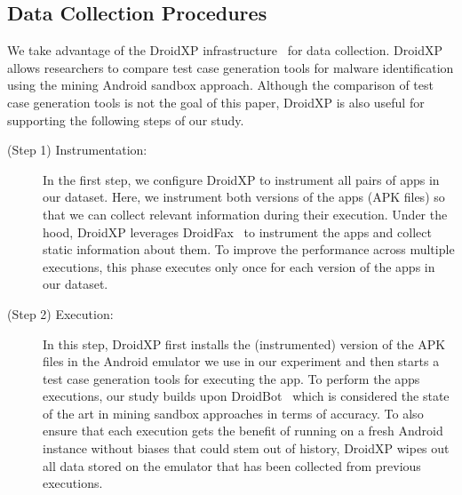 
\subsection{Data Collection Procedures} \label{sec:dataCollectionProc}


We take advantage of the DroidXP infrastructure~\cite{DBLP:conf/scam/CostaMCMVBC20}
for data collection. DroidXP allows researchers to compare 
test case generation tools for malware identification using the
mining Android sandbox approach. Although the comparison of test
case generation tools is not the goal of this paper, DroidXP
is also useful for supporting the following steps of our study.

\begin{description}
 \item[(Step 1) Instrumentation:] In the first step,
we configure DroidXP to instrument all pairs of apps in our dataset.
Here, we instrument both versions of the apps (APK files) so that
we can collect relevant information during their execution. Under the hood, DroidXP leverages
DroidFax~\cite{DBLP:conf/icsm/CaiR17a} to instrument the apps and collect static
information about them. To improve the performance across multiple executions,
this phase executes only once for each version of the apps in our dataset.

\item[(Step 2) Execution:] In this step, DroidXP first installs the (instrumented) version of the APK files in the
  Android emulator we use in our experiment and then starts a test case generation tools for executing the app. To perform the apps executions, our study builds upon DroidBot~\cite{DBLP:conf/icse/LiYGC17} which is considered the state of the art in mining sandbox approaches in terms of accuracy. To also ensure
  that each execution gets the benefit of running on a fresh Android instance without biases that could stem out of history,
  DroidXP wipes out all data stored on the emulator that has been collected from previous executions.


\end{description}
